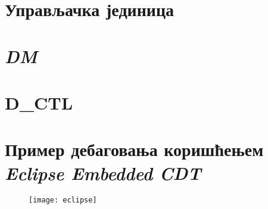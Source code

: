 \begin{appendices}

\lstset{numbers=left, numberstyle=\tiny, stepnumber=1, numbersep=5pt}

\chapter{Управљачка јединица}\label{sec.control}


\chapter{\textit{\acrfull{DM}}}\label{sec.dm}


\chapter{\textbf{D\_CTL}}\label{sec.dctl}


\chapter{Пример дебаговања коришћењем \textit{Eclipse Embedded CDT}}\label{sec.eclipse}
\begin{figure}[h!]
	\centering
	\texttt{[image: eclipse]}
\end{figure}

\end{appendices}